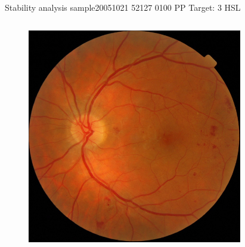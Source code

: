 \documentclass{beamer}
\begin{document}
\begin{frame}{Stability analysis sample}{20051021 52127 0100 PP Target: 3 HSL}
\begin{columns}
	\begin{column}{0.3\textwidth}
		\begin{figure}[p]
			\centering
			\includegraphics[width=\textwidth]{chapter_stability/20051021_52127_0100_PP/20051021_52127_0100_PP.jpeg}
		\end{figure}	
	\end{column}
	\begin{column}{0.45\textwidth}  %
		\begin{figure}[p]
			\centering

\end{figure}
\end{column}
\end{columns}
\end{frame}
\end{document}
